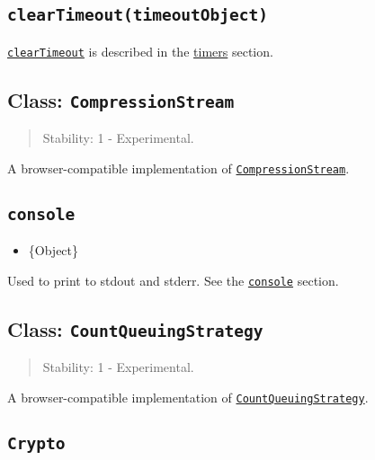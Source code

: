 \subsection{\texorpdfstring{\texttt{clearTimeout(timeoutObject)}}{clearTimeout(timeoutObject)}}\label{cleartimeouttimeoutobject}

\href{timers.md\#cleartimeouttimeout}{\texttt{clearTimeout}} is
described in the \href{timers.md}{timers} section.

\subsection{\texorpdfstring{Class:
\texttt{CompressionStream}}{Class: CompressionStream}}\label{class-compressionstream}

\begin{quote}
Stability: 1 - Experimental.
\end{quote}

A browser-compatible implementation of
\href{webstreams.md\#class-compressionstream}{\texttt{CompressionStream}}.

\subsection{\texorpdfstring{\texttt{console}}{console}}\label{console}

\begin{itemize}
\tightlist
\item
  \{Object\}
\end{itemize}

Used to print to stdout and stderr. See the
\href{console.md}{\texttt{console}} section.

\subsection{\texorpdfstring{Class:
\texttt{CountQueuingStrategy}}{Class: CountQueuingStrategy}}\label{class-countqueuingstrategy}

\begin{quote}
Stability: 1 - Experimental.
\end{quote}

A browser-compatible implementation of
\href{webstreams.md\#class-countqueuingstrategy}{\texttt{CountQueuingStrategy}}.

\subsection{\texorpdfstring{\texttt{Crypto}}{Crypto}}\label{crypto}

